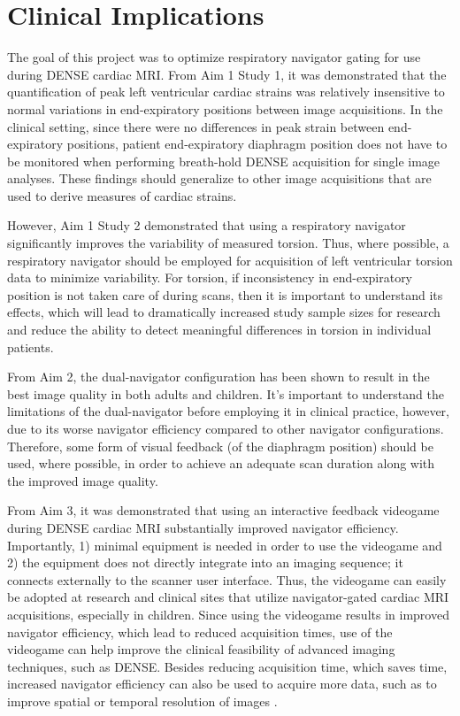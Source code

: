 \section{Clinical Implications}
	The goal of this project was to optimize respiratory navigator gating for use during DENSE cardiac MRI. From Aim 1 Study 1, it was demonstrated that the quantification of peak left ventricular cardiac strains was relatively insensitive to normal variations in end-expiratory positions between image acquisitions. In the clinical setting, since there were no differences in peak strain between end-expiratory positions, patient end-expiratory diaphragm position does not have to be monitored when performing breath-hold DENSE acquisition for single image analyses. These findings should generalize to other image acquisitions that are used to derive measures of cardiac strains.

	However, Aim 1 Study 2 demonstrated that using a respiratory navigator significantly improves the variability of measured torsion. Thus, where possible, a respiratory navigator should be employed for acquisition of left ventricular torsion data to minimize variability. For torsion, if inconsistency in end-expiratory position is not taken care of during scans, then it is important to understand its effects, which will lead to dramatically increased study sample sizes for research and reduce the ability to detect meaningful differences in torsion in individual patients.

	From Aim 2, the dual-navigator configuration has been shown to result in the best image quality in both adults and children. It's important to understand the limitations of the dual-navigator before employing it in clinical practice, however, due to its worse navigator efficiency compared to other navigator configurations. Therefore, some form of visual feedback (of the diaphragm position) should be used, where possible, in order to achieve an adequate scan duration along with the improved image quality.

	From Aim 3, it was demonstrated that using an interactive feedback videogame during DENSE cardiac MRI substantially improved navigator efficiency. Importantly, 1) minimal equipment is needed in order to use the videogame and 2) the equipment does not directly integrate into an imaging sequence; it connects externally to the scanner user interface. Thus, the videogame can easily be adopted at research and clinical sites that utilize navigator-gated cardiac MRI acquisitions, especially in children. Since using the videogame results in improved navigator efficiency, which lead to reduced acquisition times, use of the videogame can help improve the clinical feasibility of advanced imaging techniques, such as DENSE. Besides reducing acquisition time, which saves time, increased navigator efficiency can also be used to acquire more data, such as to improve spatial or temporal resolution of images \cite{Feuerlein2009}. 

